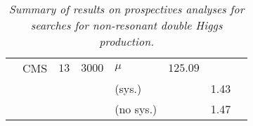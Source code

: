 \begin{table}[h!]
\begin{center}
\begin{tabular}{|l|l|c|c|l|l|c|c|}
\cline{2-8}
                &CMS            &$13$        &$3000$        &$\mu$                &$125.09$    &    &\cite{CMS:2017cwx}\\
                &            &        &        &(sys.)                &        &1.43    &\\
                 &            &        &        &(no sys.)            &        &1.47    &\\
\hline
\end{tabular}
\normalsize
\end{center}
\vspace{-0.5cm}
\caption{\normalsize\it Summary of results on prospectives analyses for searches for non-resonant double Higgs production.}
\label{Summary_analyses_searches_non_resonant_HH_prospectives}
\end{table}


